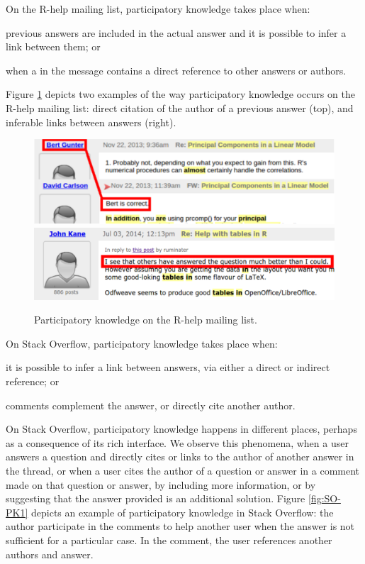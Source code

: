    On the R-help mailing list, participatory knowledge takes place when:
    \begin{enumerate*}[label=(\arabic*)]
    \item previous answers are included in the actual answer and it is possible to infer a link between them; or
    \item when a in the message contains a direct reference to other answers or authors.
    \end{enumerate*}
    Figure \ref{fig:ML-PK1} depicts two examples of the way participatory knowledge occurs on the R-help mailing list:
    direct citation of the author of a previous answer (top), and inferable links between answers (right).

    
    \begin{figure}[!htb]
        \centering
        \includegraphics[width=\columnwidth]{Figures/ML-PKimg2}
        \includegraphics[width=\columnwidth]{Figures/ML-PKimg11}
        \caption[Participatory knowledge on the R-help mailing list.]{Participatory knowledge on the R-help mailing list.}
        \label{fig:ML-PK1}
    \end{figure}

    On Stack Overflow, participatory knowledge takes place when:
    \begin{enumerate*}[label=(\arabic*)]
    \item it is possible to infer a link between answers, via either a direct or indirect reference; or
    \item comments complement the answer, or directly cite another author.
    \end{enumerate*}

    On Stack Overflow, participatory knowledge happens in different places, perhaps as a consequence of its rich interface.
    We observe this phenomena, when a user answers a question and directly cites or links to the author of another answer in the thread, or when a user cites the author of a question or answer in a comment made on that question or answer, by including more information, or by suggesting that the answer provided is an additional solution.
    Figure \ref{fig:SO-PK1} depicts an example of participatory knowledge in Stack Overflow: the author participate in the comments to help another user when the answer is not sufficient for a particular case.
    In the comment, the user references another authors and answer.

